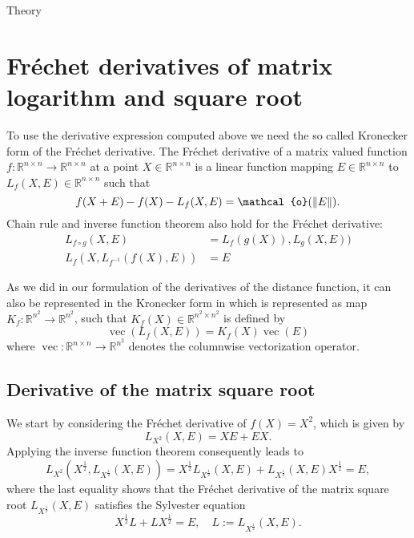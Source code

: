 \begin{chapter}{Theory}

\section{Fr\'{e}chet derivatives of matrix logarithm and square root} %
\label{sec:frechetderivatives}
To use the derivative expression computed above we need the so called Kronecker form of the Fr\'{e}chet derivative. The Fr\'{e}chet derivative
of a matrix valued function $f:\mathbb{R}^{n\times n}\to\mathbb{R}^{n\times n}$ at a point $X\in\mathbb{R}^{n\times n}$ is a linear function mapping $E\in\mathbb{R}^{n\times n}$
to $L_f(X,E)\in \mathbb{R}^{n\times n}$ such that
\begin{equation}
    f(X+E) - f(X) - L_f(X,E) = \mathcal{o}(\norm{E}).
\end{equation}
Chain rule and inverse function theorem also hold for the Fr\'{e}chet derivative:
\begin{align}
    L_{f\circ g}(X, E) &= L_{f}(g(X)),L_{g}(X,E))\\
    L_{f}(X, L_{f^{-1}}(f(X),E)) &= E
\end{align}

As we did in our formulation of the derivatives of the distance function, it can also be represented in the Kronecker form in which is represented as map
$K_f:\mathbb{R}^{n^2}\to\mathbb{R}^{n^2}$, such that $K_f(X)\in \mathbb{R}^{n^2\times n^2}$ is defined by
\begin{equation}
    \label{eq:kronckerform}
    \operatorname{vec}(L_f(X,E))=K_f(X)\operatorname{vec}(E)
\end{equation}
where $\operatorname{vec}:\mathbb{R}^{n\times n}\to\mathbb{R}^{n^2}$ denotes the columnwise vectorization operator.

\subsection{Derivative of the matrix square root} %
\label{sub:Derivative of the matrix square root}
We start by considering the Fr\'{e}chet derivative of $f(X)=X^2$, which is given by
\begin{equation}
    L_{X^2}(X,E) = XE + EX.
\end{equation}
Applying the inverse function theorem consequently leads to
\begin{equation}
    L_{X^2}(X^{\frac{1}{2}},L_{X^{\frac{1}{2}}}(X,E))=X^{\frac{1}{2}}L_{X^{\frac{1}{2}}}(X,E) + L_{X^{\frac{1}{2}}}(X,E)X^{\frac{1}{2}} = E,
\end{equation}
where the last equality shows that the Fr\'{e}chet derivative of the matrix square root $L_{X^{\frac{1}{2}}}(X,E)$ satisfies the Sylvester equation 
\begin{equation}
    \label{eq:sylvester}
    X^{\frac{1}{2}}L + LX^{\frac{1}{2}} = E,\quad L:=L_{X^{\frac{1}{2}}}(X,E).
\end{equation}


\end{chapter}
